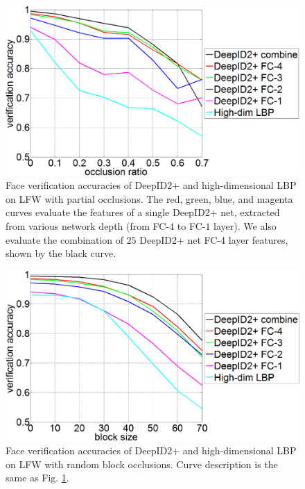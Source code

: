 \documentclass[10pt,twocolumn,letterpaper]{article}
\begin{document}
\begin{figure}[t]
\begin{center}
\includegraphics[width=0.9\linewidth]{picture/14a.png}
\end{center}
\vspace{-0.15in}
\caption{Face verification accuracies of DeepID2+ and high-dimensional LBP on LFW with partial occlusions. The red, green, blue, and magenta curves evaluate the features of a single DeepID2+ net, extracted from various network depth (from FC-$4$ to FC-$1$ layer). We also evaluate the combination of $25$ DeepID2+ net FC-4 layer features, shown by the black curve.}
\label{fig:accu_occlu}
\vspace{-0.15in}
\end{figure}

\begin{figure}[t]
\begin{center}
\includegraphics[width=0.9\linewidth]{picture/14b.png}
\end{center}
\vspace{-0.15in}
\caption{Face verification accuracies of DeepID2+ and high-dimensional LBP on LFW with random block occlusions. Curve description is the same as Fig. \ref{fig:accu_occlu}.}
\label{fig:accu_rb}
\vspace{-0.15in}
\end{figure}
\end{document}
